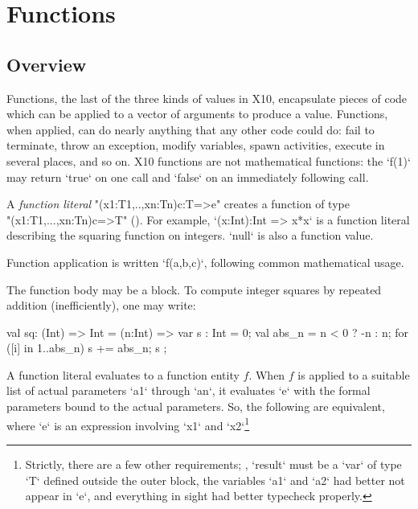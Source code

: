 

\chapter{Functions}
\label{Functions}
\label{functions}
\label{Closures}

\section{Overview}
Functions, the last of the three kinds of values in X10, encapsulate pieces of
code which can be applied to a vector of arguments to produce a value.
Functions, when applied, can do nearly anything that any other code could do:
fail to terminate, throw an exception, modify variables, spawn activities,
execute in several places, and so on. X10 functions are not mathematical
functions: the \xcd`f(1)` may return \xcd`true` on one call and \xcd`false` on
an immediately following call.



A \emph{function literal} \xcd"(x1:T1,..,xn:Tn){c}:T=>e" creates a function of
type\\ \xcd"(x1:T1,...,xn:Tn){c}=>T" ().  For example, 
\xcd`(x:Int):Int => x*x` is a function literal describing the squaring function on
integers.   
\xcd`null` is also a function value.


Function application is written \xcd`f(a,b,c)`, following common mathematical
usage. 


The function body may be a block.  To compute integer squares by repeated
addition (inefficiently), one may write: 
\begin{xten}
val sq: (Int) => Int 
      = (n:Int) => {
           var s : Int = 0;
           val abs_n = n < 0 ? -n : n;
           for ([i] in 1..abs_n) s += abs_n;
           s
        };
\end{xten}




A function literal evaluates to a function entity $f$. When {$f$} is
applied to a suitable list of actual parameters \xcd`a1` through \xcd`an`, it
evaluates \xcd`e` with the formal parameters bound to the actual parameters.
So, the following are equivalent, where \xcd`e` is an expression involving
\xcd`x1` and \xcd`x2`\footnote{Strictly, there are a few other requirements;
  \eg, \xcd`result` must be a \xcd`var` of type \xcd`T` defined outside the
  outer block, the variables \xcd`a1` and \xcd`a2` had better not appear in
  \xcd`e`, and everything in sight had better typecheck properly.}

